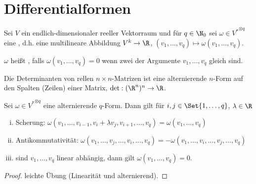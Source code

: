 \chapter{Differentialformen}

\begin{df} \label{6.1}
    Sei $V$ ein endlich-dimensionaler reeller Vektorraum und für $q \in \N_0$ sei $\omega \in {V^*}^{\otimes q}$ eine , d.h. eine multilineare Abbildung $V^k \to \R$, $(v_1, \dotsc, v_q) \mapsto \omega(v_1, \dotsc, v_q)$.

    $\omega$ heißt , falls $\omega(v_1, \dotsc, v_q) = 0$ wenn zwei der Argumente $v_1, \dotsc, v_q$ gleich sind.
\end{df}

\begin{ex*}
    Die Determinanten von rellen $n\times n$-Matrizen ist eine alternierende $n$-Form auf den Spalten (Zeilen) einer Matrix, $\det: (\R^n)^n \to \R$.
\end{ex*}

\begin{lem} \label{6.2}
    Sei $\omega \in {V^*}^{\otimes q}$ eine alternierende $q$-Form.
    Dann gilt für $i,j \in \Set{1, \dotsc, q}$, $\lambda \in \R$
    \begin{enumerate}[(i)]
        \item
            Scherung:
            \begin{math}
                \omega(v_1, \dotsc, v_{i-1}, v_i + \lambda v_j, v_{i+1}, \dotsc, v_q) = \omega(v_1, \dotsc, v_q)
            \end{math}
        \item
            Antikommutativität:
            \begin{math}
                \omega(v_1, \dotsc, v_j, \dotsc, v_i, \dotsc, v_q) = - \omega(v_1, \dotsc, v_i, \dotsc, v_j, \dotsc, v_q)
            \end{math}
        \item
            sind $v_1, \dotsc, v_q$ linear abhängig, dann gilt $\omega(v_1, \dotsc, v_q) = 0$.
    \end{enumerate}
    \begin{proof}
        leichte Übung (Linearität und alternierend).
    \end{proof}
\end{lem}



